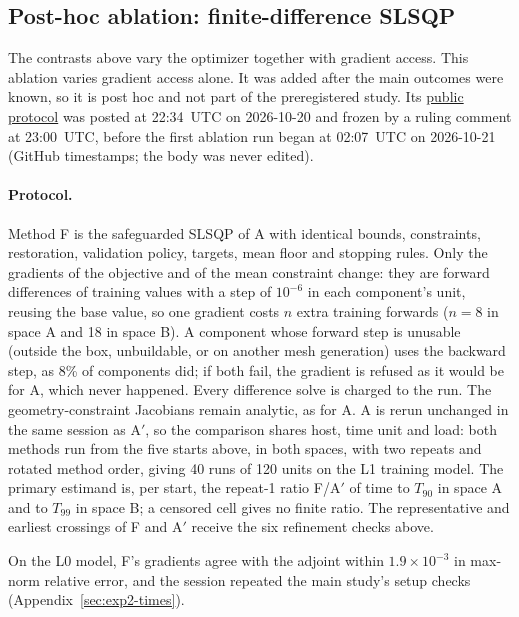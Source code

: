 \subsection{Post-hoc ablation: finite-difference SLSQP}\label{sec:exp2-fd}
The contrasts above vary the optimizer together with gradient access. This
ablation varies gradient access alone. It was added after the main
outcomes were known, so it is post hoc and not part of the preregistered
study. Its \href{https://github.com/rjwalters/geode-fem/issues/1218}{public
protocol} was posted at 22:34~UTC on 2026-10-20 and frozen by a ruling
comment at 23:00~UTC, before the first ablation run began at 02:07~UTC on
2026-10-21 (GitHub timestamps; the body was never edited).

\paragraph{Protocol.}
Method F is the safeguarded SLSQP of A with identical bounds, constraints,
restoration, validation policy, targets, mean floor and stopping rules.
Only the gradients of the objective and of the mean constraint change: they
are forward differences of training values with a step of $10^{-6}$ in each
component's unit, reusing the base value, so one gradient costs $n$ extra
training forwards ($n=8$ in space A and 18 in space B). A component whose
forward step is unusable (outside the box, unbuildable, or on another mesh
generation) uses the backward step, as 8\% of components did; if both
fail, the gradient is refused as it would be for A, which never happened. Every difference
solve is charged to the run. The geometry-constraint Jacobians remain
analytic, as for A. A is rerun unchanged in the same session as A$'$, so
the comparison shares host, time unit and load: both methods run from the
five starts above, in both spaces, with two repeats and rotated method
order, giving 40 runs of 120 units on the L1 training model. The primary
estimand is, per start, the repeat-1 ratio F/A$'$ of time to $T_{90}$ in
space A and to $T_{99}$ in space B; a censored cell gives no finite ratio.
The representative and earliest crossings of F and A$'$ receive the six
refinement checks above.

On the L0 model, F's gradients agree with the adjoint within
$1.9\times10^{-3}$ in max-norm relative error, and the session repeated
the main study's setup checks (Appendix~\ref{sec:exp2-times}).

